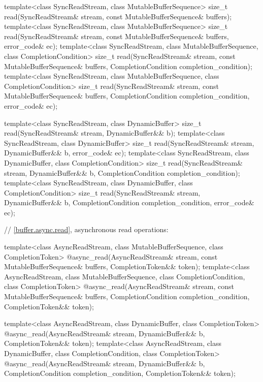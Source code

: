 \begin{codeblock}
{{{  template<class SyncReadStream, class MutableBufferSequence>
    size_t read(SyncReadStream& stream,
                const MutableBufferSequence& buffers);
  template<class SyncReadStream, class MutableBufferSequence>
    size_t read(SyncReadStream& stream,
                const MutableBufferSequence& buffers, error_code& ec);
  template<class SyncReadStream, class MutableBufferSequence,
    class CompletionCondition>
      size_t read(SyncReadStream& stream,
                  const MutableBufferSequence& buffers,
                  CompletionCondition completion_condition);
  template<class SyncReadStream, class MutableBufferSequence,
    class CompletionCondition>
      size_t read(SyncReadStream& stream,
                  const MutableBufferSequence& buffers,
                  CompletionCondition completion_condition,
                  error_code& ec);

  template<class SyncReadStream, class DynamicBuffer>
    size_t read(SyncReadStream& stream, DynamicBuffer&& b);
  template<class SyncReadStream, class DynamicBuffer>
    size_t read(SyncReadStream& stream, DynamicBuffer&& b, error_code& ec);
  template<class SyncReadStream, class DynamicBuffer, class CompletionCondition>
    size_t read(SyncReadStream& stream, DynamicBuffer&& b,
                CompletionCondition completion_condition);
  template<class SyncReadStream, class DynamicBuffer, class CompletionCondition>
    size_t read(SyncReadStream& stream, DynamicBuffer&& b,
                CompletionCondition completion_condition, error_code& ec);

  // \ref{buffer.async.read}, asynchronous read operations:

  template<class AsyncReadStream, class MutableBufferSequence,
    class CompletionToken>
      @\DEDUCED@ async_read(AsyncReadStream& stream,
                         const MutableBufferSequence& buffers,
                         CompletionToken&& token);
  template<class AsyncReadStream, class MutableBufferSequence,
    class CompletionCondition, class CompletionToken>
      @\DEDUCED@ async_read(AsyncReadStream& stream,
                         const MutableBufferSequence& buffers,
                         CompletionCondition completion_condition,
                         CompletionToken&& token);

  template<class AsyncReadStream, class DynamicBuffer, class CompletionToken>
    @\DEDUCED@ async_read(AsyncReadStream& stream,
                       DynamicBuffer&& b, CompletionToken&& token);
  template<class AsyncReadStream, class DynamicBuffer,
    class CompletionCondition, class CompletionToken>
      @\DEDUCED@ async_read(AsyncReadStream& stream,
                         DynamicBuffer&& b,
                         CompletionCondition completion_condition,
                         CompletionToken&& token);

}}}
\end{codeblock}
